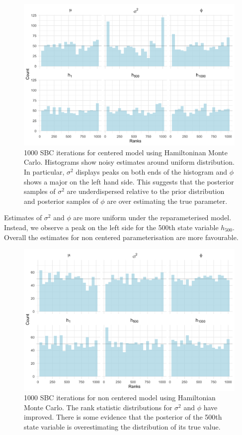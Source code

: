\documentclass[12pt, a4paper]{article}
\begin{document}
    \begin{figure}[H]
        \centering
        \includegraphics[scale=0.09]{results/hmc_cp_1k.png}
        \caption{1000 SBC iterations for centered model using Hamiltoninan Monte Carlo. Histograms show noisy estimates around uniform distribution. In particular, $\sigma^2$ displays peaks on both ends of the histogram and $\phi$ shows a major on the left hand side. This suggests that the posterior samples of $\sigma^2$ are underdispersed relative to the prior distribution and posterior samples of $\phi$ are over estimating the true parameter.}
        \label{fig:cphmc1k}
    \end{figure} 

    Estimates of $\sigma^2$ and $\phi$ are more uniform under the reparameterised model. Instead, we observe a peak on the left side for the 500th state variable $h_{500}$. Overall the estimates for non centered parameterisation are more favourable. 

    \begin{figure}[H]
        \centering
        \includegraphics[scale=0.09]{results/hmc_ncp_1k.png}
        \caption{1000 SBC iterations for non centered model using Hamiltonian Monte Carlo. The rank statistic distributions for $\sigma^2$ and $\phi$ have improved. There is some evidence that the posterior of the 500th state variable is overestimating the distribution of its true value.}
        \label{fig:ncphmc1k}
    \end{figure}
\end{document}
